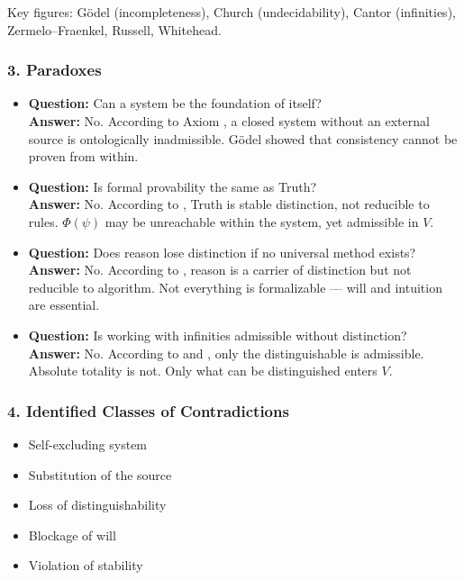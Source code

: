 \documentclass[12pt]{article}
\begin{document}
Key figures: Gödel (incompleteness), Church (undecidability), Cantor (infinities), Zermelo–Fraenkel, Russell, Whitehead.

\subsubsection*{3. Paradoxes}

\begin{itemize}
\item \textbf{Question:} Can a system be the foundation of itself?  
\\ \textbf{Answer:} No. According to Axiom \text{[1]}, a closed system without an external source is ontologically inadmissible. Gödel showed that consistency cannot be proven from within.

\item \textbf{Question:} Is formal provability the same as Truth?  
\\ \textbf{Answer:} No. According to \text{[4.4]}, Truth is stable distinction, not reducible to rules. $\Phi(\psi)$ may be unreachable within the system, yet admissible in $V$.

\item \textbf{Question:} Does reason lose distinction if no universal method exists?  
\\ \textbf{Answer:} No. According to \text{[5.3]}, reason is a carrier of distinction but not reducible to algorithm. Not everything is formalizable — will and intuition are essential.

\item \textbf{Question:} Is working with infinities admissible without distinction?  
\\ \textbf{Answer:} No. According to \text{[2]} and \text{[4.1]}, only the distinguishable is admissible. Absolute totality is not. Only what can be distinguished enters $V$.
\end{itemize}

\subsubsection*{4. Identified Classes of Contradictions}

\begin{itemize}
\item Self-excluding system
\item Substitution of the source
\item Loss of distinguishability
\item Blockage of will
\item Violation of stability
\end{itemize}
\end{document}
